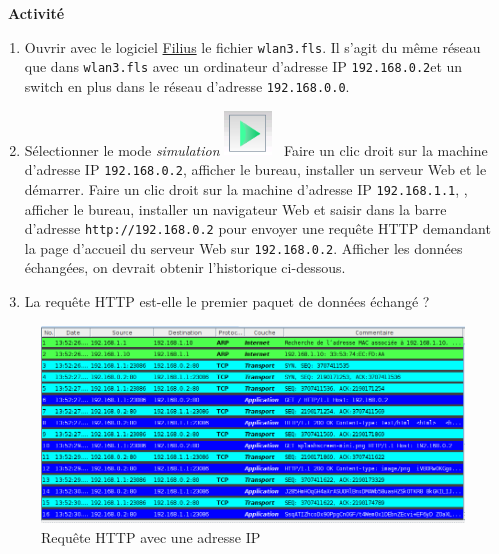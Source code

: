 \documentclass[
  11pt,
]{article}
\newcommand{\passthrough}[1]{#1}
\providecommand{\tightlist}{%
  \setlength{\itemsep}{0pt}\setlength{\parskip}{0pt}}
\newcounter{activite}
\newenvironment{activite}[1]
{\par \medskip   \noindent   \addtocounter{activite}{1}
\begin{bclogo}[arrondi =0.1,   noborder = true, logo=\bcvelo, marge=4]{~\textbf{Activité} \textbf{\theactivite} {\itshape #1} }  \par}
{
\end{bclogo}
 \par \bigskip }
\newcounter{def}
\newcounter{logi}
\newcounter{histo}
\begin{document}
\begin{activite}{}

\begin{enumerate}
\def\labelenumi{\arabic{enumi}.}
\tightlist
\item
  Ouvrir avec le logiciel
  \href{https://www.lernsoftware-filius.de/Herunterladen}{Filius} le
  fichier \passthrough{\lstinline!wlan3.fls!}. Il s'agit du même réseau
  que dans \passthrough{\lstinline!wlan3.fls!} avec un ordinateur
  d'adresse IP \passthrough{\lstinline!192.168.0.2!}et un switch en plus
  dans le réseau d'adresse \passthrough{\lstinline!192.168.0.0!}.
\item
  Sélectionner le mode \emph{simulation}
  \includegraphics[width=0.1\textwidth,height=\textheight]{images/filius-simulation.png}~
  Faire un clic droit sur la machine d'adresse IP
  \passthrough{\lstinline!192.168.0.2!}, afficher le bureau, installer
  un serveur Web et le démarrer. Faire un clic droit sur la machine
  d'adresse IP \passthrough{\lstinline!192.168.1.1!}, , afficher le
  bureau, installer un navigateur Web et saisir dans la barre d'adresse
  \passthrough{\lstinline!http://192.168.0.2!} pour envoyer une requête
  HTTP demandant la page d'accueil du serveur Web sur
  \passthrough{\lstinline!192.168.0.2!}. Afficher les données échangées,
  on devrait obtenir l'historique ci-dessous.
\item
  La requête HTTP est-elle le premier paquet de données échangé ?
\end{enumerate}

\end{activite}

\begin{figure}
\centering
\includegraphics{images/filius-tcp1.png}
\caption{Requête HTTP avec une adresse IP}
\end{figure}
\end{document}
